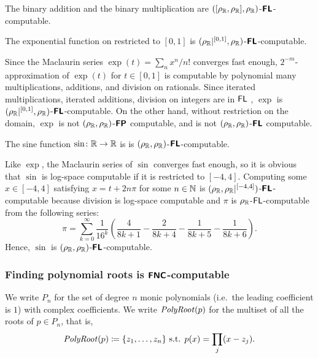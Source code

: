 \documentclass[envcountsame,orivec,oribibl]{llncs}
\begin{document}
\begin{example}
 The binary addition and the binary multiplication are
 $([\rho _\mathbb R, \rho _\mathbb R], \rho _\mathbb R)$-$\text{\bfseries \sffamily \upshape FL}$-computable.
\end{example}

\begin{lemma}
 The exponential function on restricted to $[0,1]$
 is $(\rho _\mathbb R|^{[0,1]}, \rho _\mathbb R)$-$\text{\bfseries \sffamily \upshape FL}$-computable.
\end{lemma}
Since the Maclaurin series $\exp(t) = \sum_n x^n / n!$ converges fast enough,
$2^{-m}$-approximation of $\exp(t)$ for $t \in [0,1]$ is computable 
by polynomial many multiplications, additions, and division on rationals.
Since iterated multiplications, iterated additions, division on integers
are in $\mathsf{FL}$ \cite{chiu2001division},
$\exp$ is $(\rho _\mathbb R|^{[0,1]}, \rho _\mathbb R)$-$\text{\bfseries \sffamily \upshape FL}$-computable.
On the other hand, without restriction on the domain, $\exp$ is not 
$(\rho _\mathbb R, \rho _\mathbb R)$-$\text{\bfseries \sffamily \upshape FP}$ computable, 
and is not $(\rho _\mathbb R, \rho _\mathbb R)$-$\text{\bfseries \sffamily \upshape FL}$ computable.



\begin{lemma}
  The sine function $\sin \colon \mathbb R \to \mathbb R$ is
 is $(\rho _\mathbb R, \rho _\mathbb R)$-$\text{\bfseries \sffamily \upshape FL}$-computable.
\end{lemma}
Like $\exp$, the Maclaurin series of $\sin$ converges fast enough,
so it is obvious that $\sin$ is log-space computable if it is restricted to $[-4, 4]$.
Computing some $x \in [-4, 4]$ satisfying $x = t + 2n\pi$ for 
some $n \in \mathbb N$ is
$(\rho _\mathbb R, \rho _\mathbb R|^{[-4,4]})$-$\text{\bfseries \sffamily \upshape FL}$-computable because division is log-space computable and $\pi$ is $\rho _\mathbb R$-$\mathsf{FL}$-computable from the following series:
\begin{equation}
 \pi = \sum_{k=0}^\infty \frac{1}{16^k} 
  \left( \frac{4}{8k+1} - \frac{2}{8k+4} - \frac{1}{8k+5} - \frac{1}{8k+6} \right).
\end{equation}
Hence, $\sin$ is $(\rho _\mathbb R, \rho _\mathbb R)$-$\text{\bfseries \sffamily \upshape FL}$-computable.



\subsubsection{Finding polynomial roots is $\text{\bfseries \sffamily \upshape FNC}$-computable}

We write $P_n$ for the set of degree $n$ monic 
polynomials (i.e.\ the leading coefficient is $1$) with complex coefficients.
We write $\mathit{PolyRoot}(p)$ for the multiset of all the roots of $p \in P_n$, that is,
\begin{equation}
 \mathit{PolyRoot}(p) \coloneqq \{ z_1, \dots, z_n \} \text{ s.t. } p(x) = \prod_j (x - z_j).
\end{equation}
\end{document}
